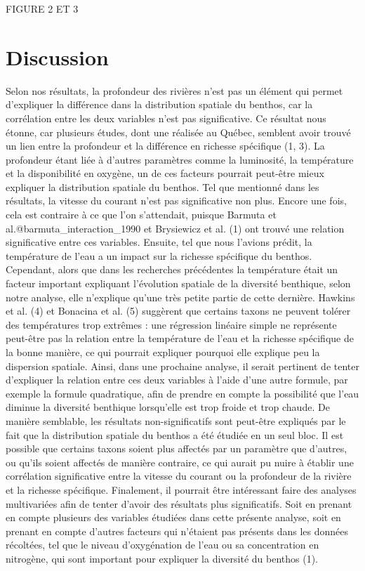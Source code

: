 \documentclass[9pt,twocolumn,twoside,]{pnas-new}
\begin{document}
FIGURE 2 ET 3

\section{Discussion}\label{discussion}

Selon nos résultats, la profondeur des rivières n'est pas un élément qui
permet d'expliquer la différence dans la distribution spatiale du
benthos, car la corrélation entre les deux variables n'est pas
significative. Ce résultat nous étonne, car plusieurs études, dont une
réalisée au Québec, semblent avoir trouvé un lien entre la profondeur et
la différence en richesse spécifique (1, 3). La profondeur étant liée à
d'autres paramètres comme la luminosité, la température et la
disponibilité en oxygène, un de ces facteurs pourrait peut-être mieux
expliquer la distribution spatiale du benthos. Tel que mentionné dans
les résultats, la vitesse du courant n'est pas significative non plus.
Encore une fois, cela est contraire à ce que l'on s'attendait, puisque
Barmuta et al.@barmuta\_interaction\_1990 et Brysiewicz et al. (1) ont
trouvé une relation significative entre ces variables. Ensuite, tel que
nous l'avions prédit, la température de l'eau a un impact sur la
richesse spécifique du benthos. Cependant, alors que dans les recherches
précédentes la température était un facteur important expliquant
l'évolution spatiale de la diversité benthique, selon notre analyse,
elle n'explique qu'une très petite partie de cette dernière. Hawkins et
al. (4) et Bonacina et al. (5) suggèrent que certains taxons ne peuvent
tolérer des températures trop extrêmes : une régression linéaire simple
ne représente peut-être pas la relation entre la température de l'eau et
la richesse spécifique de la bonne manière, ce qui pourrait expliquer
pourquoi elle explique peu la dispersion spatiale. Ainsi, dans une
prochaine analyse, il serait pertinent de tenter d'expliquer la relation
entre ces deux variables à l'aide d'une autre formule, par exemple la
formule quadratique, afin de prendre en compte la possibilité que l'eau
diminue la diversité benthique lorsqu'elle est trop froide et trop
chaude. De manière semblable, les résultats non-significatifs sont
peut-être expliqués par le fait que la distribution spatiale du benthos
a été étudiée en un seul bloc. Il est possible que certains taxons
soient plus affectés par un paramètre que d'autres, ou qu'ils soient
affectés de manière contraire, ce qui aurait pu nuire à établir une
corrélation significative entre la vitesse du courant ou la profondeur
de la rivière et la richesse spécifique. Finalement, il pourrait être
intéressant faire des analyses multivariées afin de tenter d'avoir des
résultats plus significatifs. Soit en prenant en compte plusieurs des
variables étudiées dans cette présente analyse, soit en prenant en
compte d'autres facteurs qui n'étaient pas présents dans les données
récoltées, tel que le niveau d'oxygénation de l'eau ou sa concentration
en nitrogène, qui sont important pour expliquer la diversité du benthos
(1).
\end{document}
